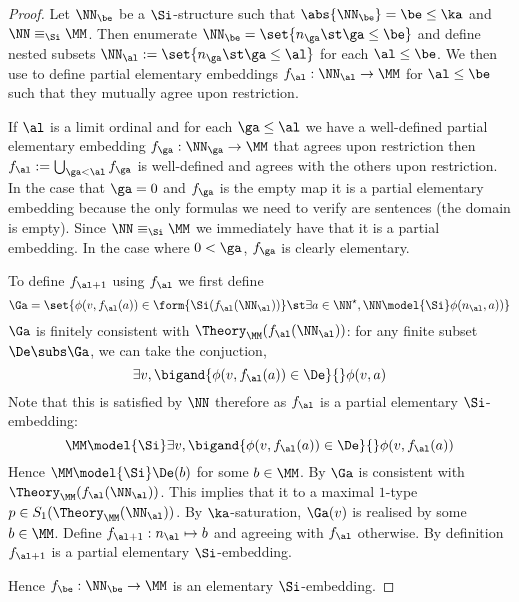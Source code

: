 \begin{proof}
    Let $\NN_\be$ be a $\Si$-structure such that 
    $\abs{\NN_\be} = \be \leq \ka$ and $\NN \equiv_\Si \MM$.
    Then enumerate $\NN_\be = \set{n_\ga \st \ga \leq \be}$
    and define nested subsets $\NN_\al := \set{n_\ga \st \ga \leq \al}$
    for each $\al \leq \be$.
    We then use  to define 
    partial elementary embeddings $f_\al : \NN_\al \to \MM$ 
    for $\al \leq \be$ such that they mutually agree upon restriction.

    If $\al$ is a limit ordinal and for each $\ga \leq \al$ we have 
    a well-defined partial elementary embedding $f_\ga : \NN_\ga \to \MM$ 
    that agrees upon restriction
    then $f_\al := \bigcup_{\ga < \al} f_\ga$ is well-defined
    and agrees with the others upon restriction.
    In the case that $\ga = 0$ and $f_\ga$ 
    is the empty map it is a partial elementary embedding 
    because the only formulas we need to verify are sentences 
    (the domain is empty).
    Since $\NN \equiv_\Si \MM$ we immediately have that it is a 
    partial embedding.
    In the case where $0 < \ga$, $f_\ga$ is clearly elementary.

    To define $f_{\al+1}$ using $f_\al$ we first define 
    \[\Ga = \set{\phi(v,f_\al(a)) \in \form{\Si(f_\al(\NN_\al))} \st
    \exists a \in \NN^\star, \NN \model{\Si} \phi(n_\al,a))}\]
    $\Ga$ is finitely consistent with $\Theory_\MM(f_\al(\NN_\al))$:
    for any finite subset $\De \subs \Ga$,
    we can take the conjuction,
    \[\exists v, \bigand{\phi(v,f_\al(a)) \in \De}{} \phi(v,a)\]
    Note that this is satisfied by $\NN$ therefore as 
    $f_\al$ is a partial elementary $\Si$-embedding:
    \[\MM \model{\Si} \exists v, 
    \bigand{\phi(v,f_\al(a)) \in \De}{} \phi(v,f_\al(a))\]
    Hence $\MM \model{\Si} \De(b)$ for some $b \in \MM$.
    By 
    $\Ga$ is consistent with $\Theory_\MM(f_\al(\NN_\al))$.
    This implies that it 
     to a maximal $1$-type 
    $p \in S_1(\Theory_\MM(\NN_\al))$.
    By $\ka$-saturation, $\Ga(v)$ is realised by some 
    $b \in \MM$.
    Define $f_{\al + 1} : n_\al \mapsto b$ and agreeing with $f_\al$ otherwise.
    By definition $f_{\al + 1}$ is a partial elementary $\Si$-embedding.

    Hence $f_\be : \NN_\be \to \MM$ is an elementary $\Si$-embedding.
\end{proof}

